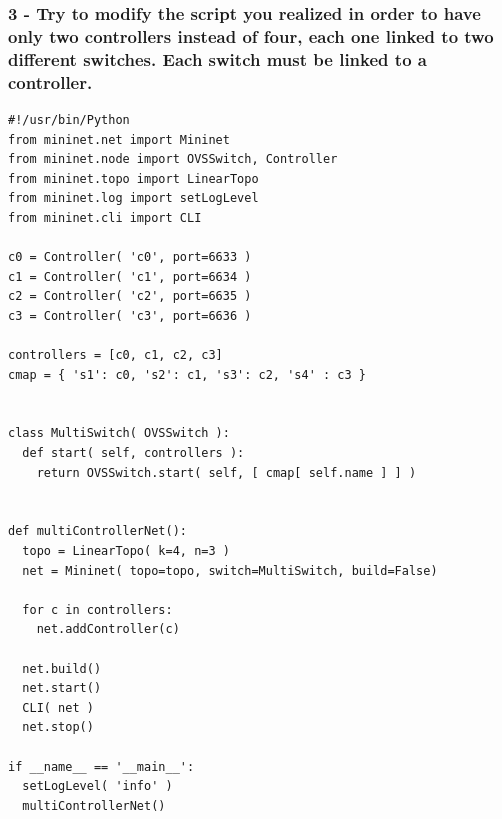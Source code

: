 \hrulefill

\hrulefill

\hrulefill


\subsubsection*{3 - Try to modify the script you realized in order to have only
two controllers instead of four, each one linked to two different switches. Each
switch must be linked to a controller. }
\hrulefill

\hrulefill

\hrulefill

\hrulefill







\begin{minipage}{\linewidth}
\begin{lstlisting}[label=lst:activity-2-script, caption=the complete Python script required for Activity 2]
#!/usr/bin/Python
from mininet.net import Mininet
from mininet.node import OVSSwitch, Controller
from mininet.topo import LinearTopo
from mininet.log import setLogLevel
from mininet.cli import CLI

c0 = Controller( 'c0', port=6633 )
c1 = Controller( 'c1', port=6634 )
c2 = Controller( 'c2', port=6635 )
c3 = Controller( 'c3', port=6636 )

controllers = [c0, c1, c2, c3]
cmap = { 's1': c0, 's2': c1, 's3': c2, 's4' : c3 }


class MultiSwitch( OVSSwitch ):
  def start( self, controllers ):
    return OVSSwitch.start( self, [ cmap[ self.name ] ] )


def multiControllerNet():
  topo = LinearTopo( k=4, n=3 )
  net = Mininet( topo=topo, switch=MultiSwitch, build=False)

  for c in controllers:
    net.addController(c)

  net.build()
  net.start()
  CLI( net )
  net.stop()

if __name__ == '__main__':
  setLogLevel( 'info' )
  multiControllerNet()
\end{lstlisting}
\end{minipage}
